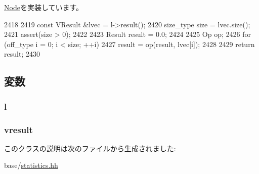 \hyperlink{classStats_1_1Node_ab152b7e89b37a7db03b04d500ceb8349}{Node}を実装しています。


\begin{DoxyCode}
2418     {
2419         const VResult &lvec = l->result();
2420         size_type size = lvec.size();
2421         assert(size > 0);
2422 
2423         Result result = 0.0;
2424 
2425         Op op;
2426         for (off_type i = 0; i < size; ++i)
2427             result = op(result, lvec[i]);
2428 
2429         return result;
2430     }
\end{DoxyCode}


\subsection{変数}
\hypertarget{classStats_1_1SumNode_a6ad7f056f60bd5cfec2caa5d5f4e363f}{
\subsubsection[{l}]{ {\bf l}}}
\label{classStats_1_1SumNode_a6ad7f056f60bd5cfec2caa5d5f4e363f}
\hypertarget{classStats_1_1SumNode_a8f41af856442757ec68f3391333d3eb2}{
\subsubsection[{vresult}]{ {\bf vresult}}}
\label{classStats_1_1SumNode_a8f41af856442757ec68f3391333d3eb2}


このクラスの説明は次のファイルから生成されました:\begin{DoxyCompactItemize}
\item 
base/\hyperlink{statistics_8hh}{statistics.hh}\end{DoxyCompactItemize}

